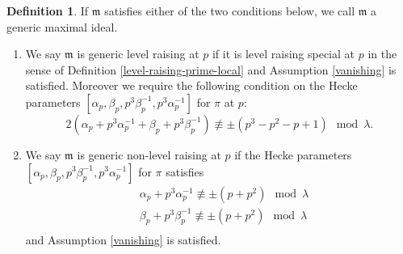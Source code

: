 \documentclass[10pt]{amsart}
\numberwithin{equation}{section}
\theoremstyle{definition}
\newtheorem{definition}[equation]{Definition}
\def\fracm{\mathfrak{m}}
\begin{document}
\begin{definition}\label{generic}
If $\fracm$ satisfies either of the two conditions below, we call $\fracm$ a generic maximal ideal.
\begin{enumerate}
\item We say $\fracm$ is generic level raising at $p$ if it is level raising special at $p$ in the sense of Definition \ref{level-raising-prime-local} and Assumption \ref{vanishing} is satisfied. Moreover we require the following condition on the Hecke parameters $[\alpha_{p}, \beta_{p}, p^{3}\beta^{-1}_{p}, p^{3}\alpha^{-1}_{p}]$ for $\pi$ at $p$:
\begin{equation*}
2(\alpha_{p}+p^{3}\alpha^{-1}_{p}+\beta_{p}+p^{3}\beta^{-1}_{p})\not \equiv \pm(p^{3}-p^{2}-p+1)\mod \lambda.
\end{equation*}

\item We say $\fracm$ is generic non-level raising at $p$ if the Hecke parameters $[\alpha_{p}, \beta_{p}, p^{3}\beta^{-1}_{p}, p^{3}\alpha^{-1}_{p}]$ for $\pi$ satisfies 
\begin{equation*}
\begin{aligned}
&\alpha_{p}+p^{3}\alpha^{-1}_{p}\not\equiv \pm (p+ p^{2})\mod \lambda\\ 
&\beta_{p}+p^{3}\beta^{-1}_{p}\not\equiv \pm (p+ p^{2})\mod \lambda\\
\end{aligned}
\end{equation*}
and Assumption \ref{vanishing} is satisfied.
\end{enumerate}
\end{definition}
\end{document}
